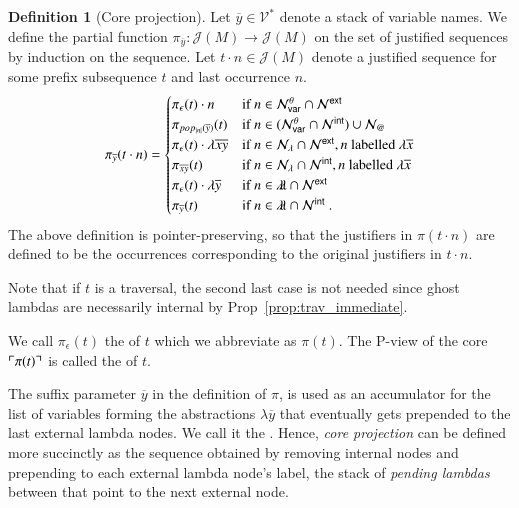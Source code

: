 \documentclass{elsarticle}
\makeatletter
\theoremstyle{plain}
\theoremstyle{definition}
\newtheorem{definition}{Definition}[section]
\theoremstyle{remark}
\newcommand\VarSet{\mathcal{V}}
\newcommand\Nodes{\mathcal{N}}%
\newcommand\NodesVar{\Nodes_{\sf var}}%
\newcommand\NodesLmd{\Nodes_\lambda}%
\newcommand\NodesApp{\Nodes_@}%
\newcommand{\ghostlmd}{{\lambda\!\!\lambda}}
\newcommand{\ghostvar}{\theta}
\newcommand\ImNodesVar{\NodesVar^\ghostvar}
\def\coresymbol{\pi} %
\newcommand{\core}[1]{\coresymbol(#1)} %
\newcommand{\ExtNodes}{\Nodes^{\sf ext}}
\newcommand{\IntNodes}{\Nodes^{\sf int}}
\def\justseqset{\mathcal{J}}
\makeatother
\begin{document}
\begin{definition}[Core projection]
\label{def:coreprojection}
Let $\overline{y} \in \VarSet^*$ denote a stack of variable names.
We define the partial function $\coresymbol_{\overline{y}}\colon \justseqset(M) \longrightarrow \justseqset(M)$ on the set of justified sequences by induction on the sequence.
Let $t \cdot n\in\justseqset(M)$ denote a justified sequence for some prefix subsequence $t$ and last occurrence $n$.
\begin{equation*}
\coresymbol_{\overline{y}}(t\cdot n) =
\begin{cases}
\coresymbol_{\epsilon}(t) \cdot n
    & \mbox{if } n\in\ImNodesVar\inter\ExtNodes \\
\coresymbol_{pop_{|n|}(\overline{y})}(t)
    & \mbox{if } n\in(\ImNodesVar\inter\IntNodes)\union\NodesApp \\
\coresymbol_{\epsilon}(t) \cdot \lambda \overline{x}\overline{y}
    & \mbox{if } n\in\NodesLmd\inter\ExtNodes, n \mbox{ labelled } \lambda\overline{x}\\
\coresymbol_{\overline{x} \overline{y}}(t)
    & \mbox{if } n\in\NodesLmd\inter\IntNodes, n \mbox{ labelled } \lambda\overline{x} \\
\coresymbol_{\epsilon}(t) \cdot\lambda\overline{y}
    & \mbox{if } n\in\ghostlmd\inter\ExtNodes \\
\coresymbol_{\overline{y}}(t)
    & \mbox{if } n\in\ghostlmd\inter\IntNodes \ .
\end{cases}
\end{equation*}
The above definition is pointer-preserving, so that the justifiers in $\coresymbol(t\cdot n)$ are defined to be the occurrences corresponding to the original justifiers in $t \cdot n$.

Note that if $t$ is a traversal, the second last case is not needed since ghost lambdas are necessarily internal by Prop~\ref{prop:trav_immediate}.

We call $\coresymbol_\epsilon(t)$ the  of $t$ which we abbreviate as $\core{t}$. The P-view of the core $\pview{\core{t}}$ is called the  of $t$.
\end{definition}

The suffix parameter $\overline{y}$ in the definition of $\coresymbol$, is used as an accumulator for the list of variables forming the abstractions $\lambda \overline{y}$ that eventually gets prepended to the last external lambda nodes. We call it the . Hence, \emph{core projection} can be defined more succinctly as the sequence obtained by removing internal nodes and prepending to each external lambda node's label, the stack of \emph{pending lambdas} between that point to the next external node.
\end{document}
